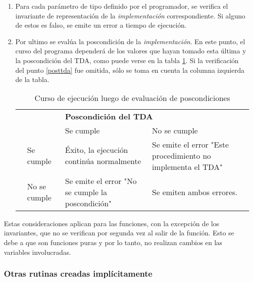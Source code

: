 {{\begin{enumerate}
  \item Para cada parámetro de tipo definido por el programador, se verifica el
  invariante de representación de la \textit{implementación} correspondiente. Si
  alguno de estos es falso, se emite un error a tiempo de ejecución.

  \item Por ultimo se evalúa la poscondición de la \textit{implementación}. En
  este punto, el curso del programa dependerá de los valores que hayan tomado
  esta última y la poscondición del TDA, como puede verse en la tabla
  \ref{table:posconds}. Si la verificación del punto \ref{posttda} fue omitida,
  sólo se toma en cuenta la columna izquierda de la tabla.

  \begin{table}[]
  \centering
  \begin{tabular}{ll|l|l|}
  \cline{3-4}
  \multicolumn{2}{l}{\multirow{2}{*}{}} & \multicolumn{2}{l|}{\textbf{Poscondición del TDA}} \\ \cline{3-4}
  \multicolumn{2}{l}{} & Se cumple & No se cumple \\ \hline
  \multicolumn{1}{|l|}{\multirow{2}{*}{\belowbaseline[0ex]{\rotatebox[origin=c]{90}{\parbox[c]{1cm}{\centering\textbf{Poscondición \\ de la \\ implementación}}}}}} & Se cumple & Éxito, la ejecución continúa normalmente & Se emite el error "Este procedimiento no implementa el TDA" \\ \cline{2-4}
  \multicolumn{1}{|l|}{} & No se cumple & Se emite el error "No se cumple la poscondición" & Se emiten ambos errores. \\ \hline
  \end{tabular}
  \caption{Curso de ejecución luego de evaluación de poscondiciones}
  \label{table:posconds}
  \end{table}

\end{enumerate}

Estas consideraciones aplican para las funciones, con la excepción de los
invariantes, que no se verifican por segunda vez al salir de la función. Esto se
debe a que son funciones puras y por lo tanto, no realizan cambios en las
variables involucradas.

\subsubsection{Otras rutinas creadas implícitamente}

}}
